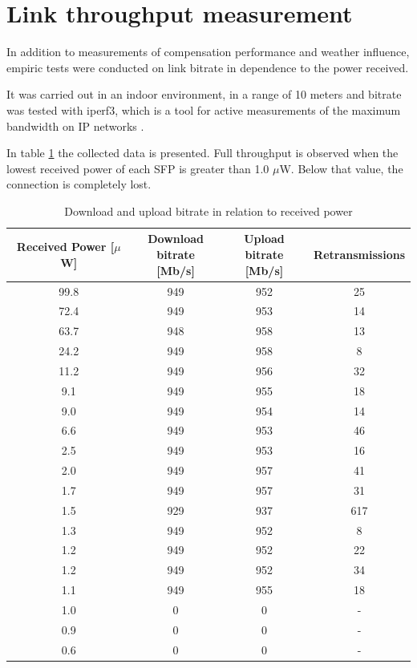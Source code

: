 \documentclass[master,oneside,en,oldtitlepage]{dyplompwr}
\begin{document}
\section{Link throughput measurement}
In addition to measurements of compensation performance and weather influence, empiric tests were conducted on link bitrate in dependence to the power received.

It was carried out in an indoor environment, in a range of 10 meters and bitrate was tested with iperf3, which is a tool for active measurements of the maximum bandwidth on IP networks \cite{iperf_website}.

In table \ref{tab:throughput} the collected data is presented. Full throughput is observed when the lowest received power of each SFP is greater than 1.0 $\mu$W. Below that value, the connection is completely lost.

\begin{table}[h!]
\centering
\begin{tabular}{cccc}
\toprule
\makecell{Received \\ Power [$\mu$W]} & \makecell{Download \\ bitrate [Mb/s]} & \makecell{Upload \\ bitrate [Mb/s]} & Retransmissions \\ 
\midrule
99.8  & 949 & 952 & 25  \\ 
72.4  & 949 & 953 & 14  \\ 
63.7  & 948 & 958 & 13  \\ 
24.2  & 949 & 958 & 8  \\ 
11.2  & 949 & 956 & 32  \\ 
9.1 & 949 & 955 & 18  \\
9.0 & 949 & 954 & 14  \\
6.6 & 949 & 953 & 46  \\
2.5 & 949 & 953 & 16  \\
2.0  & 949 & 957 & 41  \\ 
1.7 & 949 & 957 & 31  \\
1.5 & 929 & 937 & 617 \\ 
1.3 & 949 & 952 & 8   \\
1.2 & 949 & 952 & 22  \\
1.2 & 949 & 952 & 34   \\
1.1 & 949 & 955 & 18  \\
1.0 & 0   & 0   & -   \\
0.9 & 0   & 0   & -   \\
0.6 & 0   & 0   & -   \\
\bottomrule
\end{tabular}
\caption{Download and upload bitrate in relation to received power}
\label{tab:throughput}
\end{table}
\end{document}
